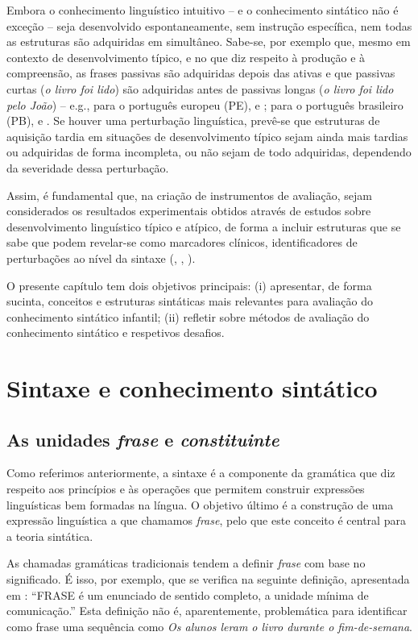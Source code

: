 \documentclass[output=paper,colorlinks,citecolor=brown,booklanguage=portuguese]{langscibook}
\begin{document}
Embora o conhecimento linguístico intuitivo – e o conhecimento sintático não é exceção – seja desenvolvido espontaneamente, sem instrução específica, nem todas as estruturas são adquiridas em simultâneo. Sabe-se, por exemplo que, mesmo em contexto de desenvolvimento típico, e no que diz respeito à produção e à compreensão, as frases passivas são adquiridas depois das ativas e que passivas curtas (\emph{o livro foi lido}) são adquiridas antes de passivas longas (\emph{o livro foi lido pelo João}) – e.g., para o português europeu (PE), \citet{Estrela2014} e \citet{Agostinho2020}; para o português brasileiro (PB), \citet{LimaJunior2016} e \citet{Correa2017}. Se houver uma perturbação linguística, prevê-se que estruturas de aquisição tardia em situações de desenvolvimento típico sejam ainda mais tardias ou adquiridas de forma incompleta, ou não sejam de todo adquiridas, dependendo da severidade dessa perturbação. 

Assim, é fundamental que, na criação de instrumentos de avaliação, sejam considerados os resultados experimentais obtidos através de estudos sobre desenvolvimento linguístico típico e atípico, de forma a incluir estruturas que se sabe que podem revelar-se como marcadores clínicos, identificadores de perturbações ao nível da sintaxe (\citealp{Costa2016, Martins2017}, , ). 

O presente capítulo tem dois objetivos principais: (i) apresentar, de forma sucinta, conceitos e estruturas sintáticas mais relevantes para avaliação do conhecimento sintático infantil; (ii) refletir sobre métodos de avaliação do conhecimento sintático e respetivos desafios.

\section{Sintaxe e conhecimento sintático}\label{sec:in_second_part}
\subsection{As unidades \emph{frase} e \emph{constituinte}}
Como referimos anteriormente, a sintaxe é a componente da gramática que diz respeito aos princípios e às operações que permitem construir expressões linguísticas bem formadas na língua. O objetivo último é a construção de uma expressão linguística a que chamamos \emph{frase}, pelo que este conceito é central para a teoria sintática.

As chamadas gramáticas tradicionais tendem a definir \emph{frase} com base no significado. É isso, por exemplo, que se verifica na seguinte definição, apresentada em \citet[119]{Cunha1984}: “FRASE é um enunciado de sentido completo, a unidade mínima de comunicação.” Esta definição não é, aparentemente, problemática para identificar como frase uma sequência como \emph{Os alunos leram o livro durante o fim-de-semana}.
\end{document}
